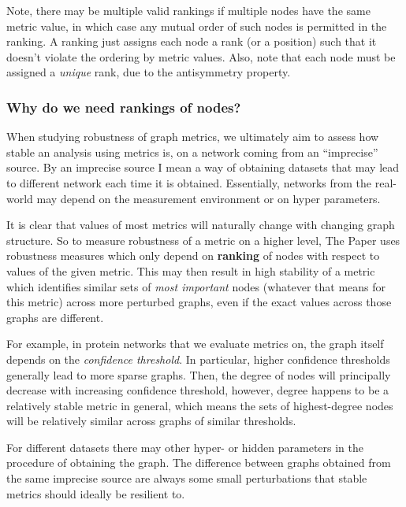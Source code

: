 Note, there may be multiple valid rankings if multiple nodes have the same metric value, in which case any mutual order of such nodes is permitted in the ranking.
A ranking just assigns each node a rank (or a position) such that it doesn't violate the ordering by metric values.
Also, note that each node must be assigned a \textsl{unique} rank, due to the antisymmetry property.


\subsubsection*{Why do we need rankings of nodes?}


When studying robustness of graph metrics, we ultimately aim to assess how stable an analysis using metrics is, on a network coming from an ``imprecise'' source.
By an imprecise source I mean a way of obtaining datasets that may lead to different network each time it is obtained.
Essentially, networks from the real-world may depend on the measurement environment or on hyper parameters.

It is clear that values of most metrics will naturally change with changing graph structure.
So to measure robustness of a metric on a higher level, The Paper uses robustness measures which only depend on \textbf{ranking} of nodes with respect to values of the given metric.
This may then result in high stability of a metric which identifies similar sets of \textsl{most important} nodes (whatever that means for this metric) across more perturbed graphs, even if the exact values across those graphs are different.

\parspace

For example, in protein networks that we evaluate metrics on, the graph itself depends on the \textsl{confidence threshold}.
In particular, higher confidence thresholds generally lead to more sparse graphs.
Then, the degree of nodes will principally decrease with increasing confidence threshold, however, degree happens to be a relatively stable metric in general, which means the sets of highest-degree nodes will be relatively similar across graphs of similar thresholds.

For different datasets there may other hyper- or hidden parameters in the procedure of obtaining the graph.
The difference between graphs obtained from the same imprecise source are always some small perturbations that stable metrics should ideally be resilient to.

